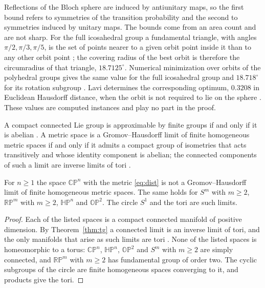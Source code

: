 Reflections of the Bloch sphere are induced by antiunitary maps, so the first bound refers to symmetries of the transition probability and the second to symmetries induced by unitary maps. The bounds come from an area count and are not sharp. For the full icosahedral group a fundamental triangle, with angles $\pi/2,\pi/3,\pi/5$, is the set of points nearer to a given orbit point inside it than to any other orbit point \cite{lavi}; the covering radius of the best orbit is therefore the circumradius of that triangle, $18.7125^\circ$. Numerical minimization over orbits of the polyhedral groups gives the same value for the full icosahedral group and $18.718^\circ$ for its rotation subgroup \cite{comp,comp2}. Lavi determines the corresponding optimum, $0.3208$ in Euclidean Hausdorff distance, when the orbit is not required to lie on the sphere \cite{lavi}. These values are computed instances and play no part in the proof.

\begin{theorem}\label{thm:tg}
A compact connected Lie group is approximable by finite groups if and only if it is abelian \cite{turing,breuillard}. A metric space is a Gromov--Hausdorff limit of finite homogeneous metric spaces if and only if it admits a compact group of isometries that acts transitively and whose identity component is abelian; the connected components of such a limit are inverse limits of tori \cite{gelander}.
\end{theorem}

\begin{corollary}\label{cor:gh}
For $n\ge1$ the space $\mathbb{CP}^n$ with the metric \eqref{eq:dist} is not a Gromov--Hausdorff limit of finite homogeneous metric spaces. The same holds for $S^m$ with $m\ge2$, $\mathbb{RP}^m$ with $m\ge2$, $\mathbb{HP}^n$ and $\mathbb{OP}^2$. The circle $S^1$ and the tori are such limits.
\end{corollary}
\begin{proof}
Each of the listed spaces is a compact connected manifold of positive dimension. By Theorem~\ref{thm:tg} a connected limit is an inverse limit of tori, and the only manifolds that arise as such limits are tori \cite{gelanderlect}. None of the listed spaces is homeomorphic to a torus: $\mathbb{CP}^n$, $\mathbb{HP}^n$, $\mathbb{OP}^2$ and $S^m$ with $m\ge2$ are simply connected, and $\mathbb{RP}^m$ with $m\ge2$ has fundamental group of order two. The cyclic subgroups of the circle are finite homogeneous spaces converging to it, and products give the tori.
\end{proof}

